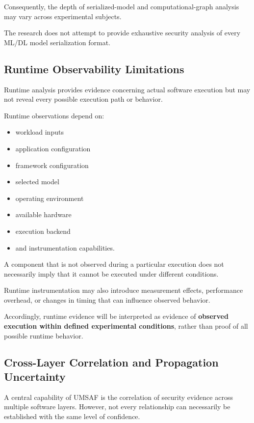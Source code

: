 \documentclass[
  12pt,
  letterpaper,
  oneside]{report}
\providecommand{\tightlist}{%
  \setlength{\itemsep}{0pt}\setlength{\parskip}{0pt}}
\begin{document}
Consequently, the depth of serialized-model and computational-graph
analysis may vary across experimental subjects.

The research does not attempt to provide exhaustive security analysis of
every ML/DL model serialization format.

\subsection{Runtime Observability Limitations}\label{1317-runtime-observability-limitations}

Runtime analysis provides evidence concerning actual software execution
but may not reveal every possible execution path or behavior.

Runtime observations depend on:

\begin{itemize}
\tightlist
\item
  workload inputs
\item
  application configuration
\item
  framework configuration
\item
  selected model
\item
  operating environment
\item
  available hardware
\item
  execution backend
\item
  and instrumentation capabilities.
\end{itemize}

A component that is not observed during a particular execution does not
necessarily imply that it cannot be executed under different conditions.

Runtime instrumentation may also introduce measurement effects,
performance overhead, or changes in timing that can influence observed
behavior.

Accordingly, runtime evidence will be interpreted as evidence of
\textbf{observed execution within defined experimental conditions},
rather than proof of all possible runtime behavior.

\subsection{Cross-Layer Correlation and Propagation Uncertainty}\label{1318-cross-layer-correlation-and-propagation-uncertainty}

A central capability of UMSAF is the correlation of security evidence
across multiple software layers. However, not every relationship can
necessarily be established with the same level of confidence.
\end{document}
